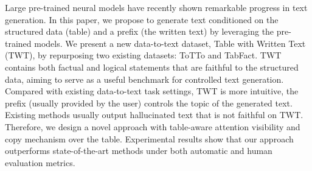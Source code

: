 Large pre-trained neural models have recently shown remarkable progress in text generation. In this paper, we propose to generate text conditioned on the structured data (table) and a prefix (the written text) by leveraging the pre-trained models. We present a new data-to-text dataset, Table with Written Text (TWT), by repurposing two existing datasets: ToTTo and TabFact. TWT contains both factual and logical statements that are faithful to the structured data, aiming to serve as a useful benchmark for controlled text generation. Compared with existing data-to-text task settings, TWT is more intuitive, the prefix (usually provided by the user) controls the topic of the generated text. Existing methods usually output hallucinated text that is not faithful on TWT. Therefore, we design a novel approach with table-aware attention visibility and copy mechanism over the table. Experimental results show that our approach outperforms state-of-the-art methods under both automatic and human evaluation metrics.
